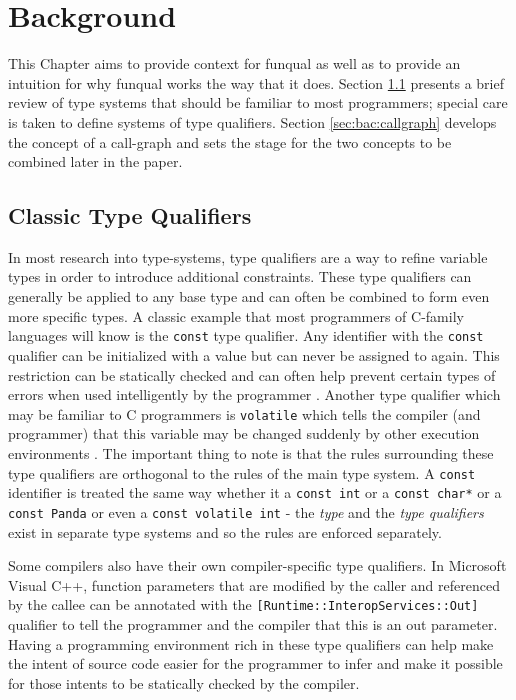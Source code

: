 \chapter{Background}\label{sec:background}

This Chapter aims to provide context for funqual as well as to provide an intuition for why funqual works the way that it does.  Section \ref{sec:bac:varqual} presents a brief review of type systems that should be familiar to most programmers; special care is taken to define systems of type qualifiers.  Section \ref{sec:bac:callgraph} develops the concept of a call-graph and sets the stage for the two concepts to be combined later in the paper.  

\section{Classic Type Qualifiers}\label{sec:bac:varqual}

In most research into type-systems, type qualifiers are a way to refine variable types in order to introduce additional constraints.  These type qualifiers can generally be applied to any base type and can often be combined to form even more specific types.  A classic example that most programmers of C-family languages will know is the \lstinline{const} type qualifier.  Any identifier with the \lstinline{const} qualifier can be initialized with a value but can never be assigned to again.  This restriction can be statically checked and can often help prevent certain types of errors when used intelligently by the programmer \cite{theory-of-qual}.  Another type qualifier which may be familiar to C programmers is \lstinline{volatile} which tells the compiler (and programmer) that this variable may be changed suddenly by other execution environments \cite{theory-of-qual}.  The important thing to note is that the rules surrounding these type qualifiers are orthogonal to the rules of the main type system.  A \lstinline{const} identifier is treated the same way whether it a \lstinline{const int} or a \lstinline{const char*} or a \lstinline{const Panda} or even a \lstinline{const volatile int} - the \textit{type} and the \textit{type qualifiers} exist in separate type systems and so the rules are enforced separately.  

Some compilers also have their own compiler-specific type qualifiers.  In Microsoft Visual C++, function parameters that are modified by the caller and referenced by the callee can be annotated with the \lstinline{[Runtime::InteropServices::Out]} qualifier to tell the programmer and the compiler that this is an out parameter.  Having a programming environment rich in these type qualifiers can help make the intent of source code easier for the programmer to infer and make it possible for those intents to be statically checked by the compiler.  

